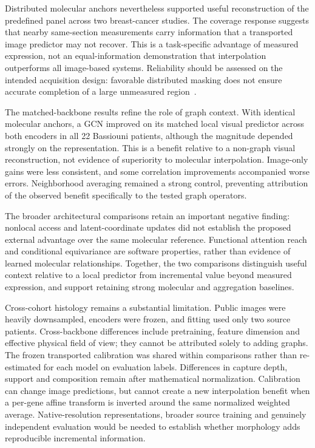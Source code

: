 Distributed molecular anchors nevertheless supported useful reconstruction of the predefined panel across two breast-cancer studies. The coverage response suggests that nearby same-section measurements carry information that a transported image predictor may not recover. This is a task-specific advantage of measured expression, not an equal-information demonstration that interpolation outperforms all image-based systems. Reliability should be assessed on the intended acquisition design: favorable distributed masking does not ensure accurate completion of a large unmeasured region~\cite{roberts2017}.

The matched-backbone results refine the role of graph context. With identical molecular anchors, a GCN improved on its matched local visual predictor across both encoders in all 22 Bassiouni patients, although the magnitude depended strongly on the representation. This is a benefit relative to a non-graph visual reconstruction, not evidence of superiority to molecular interpolation. Image-only gains were less consistent, and some correlation improvements accompanied worse errors. Neighborhood averaging remained a strong control, preventing attribution of the observed benefit specifically to the tested graph operators.

The broader architectural comparisons retain an important negative finding: nonlocal access and latent-coordinate updates did not establish the proposed external advantage over the same molecular reference. Functional attention reach and conditional equivariance are software properties, rather than evidence of learned molecular relationships. Together, the two comparisons distinguish useful context relative to a local predictor from incremental value beyond measured expression, and support retaining strong molecular and aggregation baselines.

Cross-cohort histology remains a substantial limitation. Public images were heavily downsampled, encoders were frozen, and fitting used only two source patients. Cross-backbone differences include pretraining, feature dimension and effective physical field of view; they cannot be attributed solely to adding graphs. The frozen transported calibration was shared within comparisons rather than re-estimated for each model on evaluation labels. Differences in capture depth, support and composition remain after mathematical normalization. Calibration can change image predictions, but cannot create a new interpolation benefit when a per-gene affine transform is inverted around the same normalized weighted average. Native-resolution representations, broader source training and genuinely independent evaluation would be needed to establish whether morphology adds reproducible incremental information.

